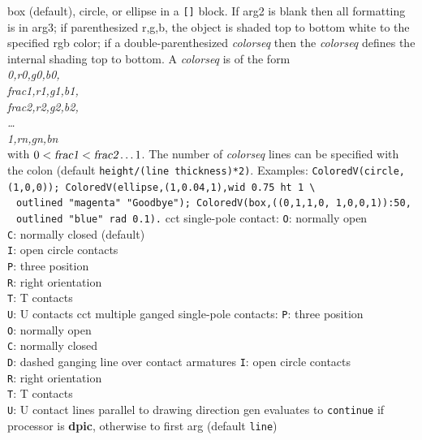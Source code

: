   {box (default), circle, or ellipse in a {\tt []} block.
   If arg2 is blank
   then all formatting is in arg3; if parenthesized r,g,b, the object
   is shaded top to bottom white to the specified rgb color; if a
   double-parenthesized {\sl colorseq} then the {\sl colorseq}
   defines the internal
   shading top to bottom.  A {\sl colorseq} is of the form\\
   {\sl 0,r0,g0,b0,\\
    frac1,r1,g1,b1,\\
    frac2,r2,g2,b2,\\
   \ldots\\
    1,rn,gn,bn}\\
   with $0 < \hbox{\sl frac1} < \hbox{\sl frac2} \ldots 1$.
   The number of {\sl colorseq} lines can be specified with the colon
   (default {\tt height/(line thickness)*2)}.
   Examples: {\tt ColoredV(circle,(1,0,0));
   ColoredV(ellipse,(1,0.04,1),wid 0.75 ht 1 \textbackslash\\
    $\;$ outlined "magenta" "Goodbye");
   ColoredV(box,((0,1,1,0, 1,0,0,1)):50, \\
    $\;$ outlined "blue" rad 0.1).} }%
%
  {cct}%
  {single-pole contact:
   {\tt O}:  normally open\\
   {\tt C}: normally closed (default)\\
   {\tt I}: open circle contacts\\
   {\tt P}: three position\\
   {\tt R}: right orientation\\
   {\tt T}: T contacts\\
   {\tt U}: U contacts
   }%
%
  {cct}%
  {multiple ganged single-pole contacts:
   {\tt P}: three position\\
   {\tt O}: normally open\\
   {\tt C}: normally closed\\
   {\tt D}: dashed ganging line over contact armatures
   {\tt I}: open circle contacts\\
   {\tt R}: right orientation\\
   {\tt T}: T contacts\\
   {\tt U}: U contact lines parallel to drawing direction
   }%
%
  {gen}%
  {evaluates to {\tt continue}
    if processor is {\bf dpic}, otherwise to first arg (default {\tt line})}%
%
